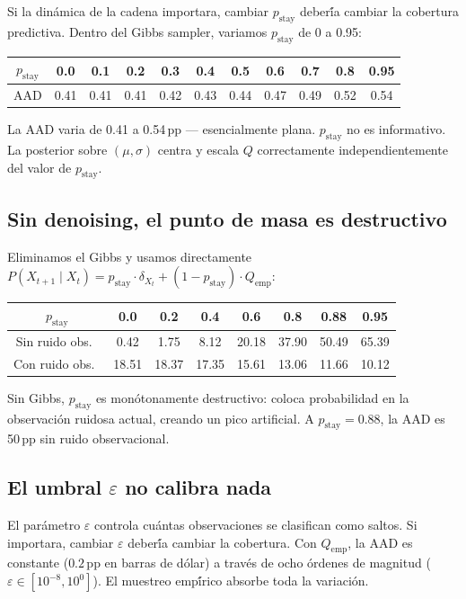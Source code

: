 \documentclass[12pt,letterpaper]{article}
\newcommand{\pstay}{p_{\text{stay}}}
\begin{document}
Si la din\'{a}mica de la cadena importara, cambiar $\pstay$ deber\'{\'i}a cambiar la cobertura predictiva. Dentro del Gibbs sampler, variamos $\pstay$ de 0 a 0.95:

\begin{center}
\begin{tabular}{ccccccccccc}
\toprule
$\pstay$ & 0.0 & 0.1 & 0.2 & 0.3 & 0.4 & 0.5 & 0.6 & 0.7 & 0.8 & 0.95 \\
\midrule
AAD & 0.41 & 0.41 & 0.41 & 0.42 & 0.43 & 0.44 & 0.47 & 0.49 & 0.52 & 0.54 \\
\bottomrule
\end{tabular}
\end{center}

La AAD varia de 0.41 a 0.54\,pp --- esencialmente plana. $\pstay$ no es informativo. La posterior sobre $(\mu, \sigma)$ centra y escala $Q$ correctamente independientemente del valor de $\pstay$.

\subsection{Sin denoising, el punto de masa es destructivo}

Eliminamos el Gibbs y usamos directamente $P(X_{t+1} \mid X_t) = \pstay \cdot \delta_{X_t} + (1-\pstay) \cdot Q_{\text{emp}}$:

\begin{center}
\begin{tabular}{cccccccc}
\toprule
$\pstay$ & 0.0 & 0.2 & 0.4 & 0.6 & 0.8 & 0.88 & 0.95 \\
\midrule
Sin ruido obs.\ & 0.42 & 1.75 & 8.12 & 20.18 & 37.90 & 50.49 & 65.39 \\
Con ruido obs.\ & 18.51 & 18.37 & 17.35 & 15.61 & 13.06 & 11.66 & 10.12 \\
\bottomrule
\end{tabular}
\end{center}

Sin Gibbs, $\pstay$ es mon\'{o}tonamente destructivo: coloca probabilidad en la observaci\'{o}n ruidosa actual, creando un pico artificial. A $\pstay = 0.88$, la AAD es 50\,pp sin ruido observacional.

\subsection{El umbral $\varepsilon$ no calibra nada}

El par\'{a}metro $\varepsilon$ controla cu\'{a}ntas observaciones se clasifican como saltos. Si importara, cambiar $\varepsilon$ deber\'{\'i}a cambiar la cobertura. Con $Q_{\text{emp}}$, la AAD es constante ($0.2$\,pp en barras de d\'{o}lar) a trav\'{e}s de ocho \'{o}rdenes de magnitud ($\varepsilon \in [10^{-8}, 10^0]$). El muestreo emp\'{\'i}rico absorbe toda la variaci\'{o}n.
\end{document}
